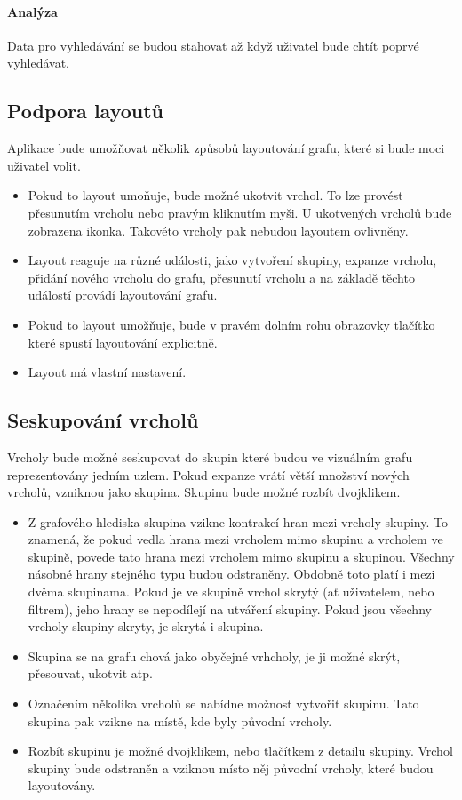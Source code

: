 \paragraph{Analýza} Data pro vyhledávání se budou stahovat až když uživatel bude chtít poprvé vyhledávat.

\subsection{Podpora layoutů}
Aplikace bude umožňovat několik způsobů layoutování grafu, které si bude moci uživatel volit.

\begin{itemize}
    \item Pokud to layout umoňuje, bude možné ukotvit vrchol. To lze provést přesunutím vrcholu nebo pravým kliknutím myši. U ukotvených vrcholů bude zobrazena ikonka. Takovéto vrcholy pak nebudou layoutem ovlivněny.
    \item Layout reaguje na různé události, jako vytvoření skupiny, expanze vrcholu, přidání nového vrcholu do grafu, přesunutí vrcholu a na základě těchto událostí provádí layoutování grafu.
    \item Pokud to layout umožňuje, bude v pravém dolním rohu obrazovky tlačítko které spustí layoutování explicitně.
    \item Layout má vlastní nastavení.
\end{itemize}

\subsection{Seskupování vrcholů}
Vrcholy bude možné seskupovat do skupin které budou ve vizuálním grafu reprezentovány jedním uzlem. Pokud expanze vrátí větší množství nových vrcholů, vzniknou jako skupina. Skupinu bude možné rozbít dvojklikem.

\begin{itemize}
    \item Z grafového hlediska skupina vzikne kontrakcí hran mezi vrcholy skupiny. To znamená, že pokud vedla hrana mezi vrcholem mimo skupinu a vrcholem ve skupině, povede tato hrana mezi vrcholem mimo skupinu a skupinou. Všechny násobné hrany stejného typu budou odstraněny. Obdobně toto platí i mezi dvěma skupinama. Pokud je ve skupině vrchol skrytý (ať uživatelem, nebo filtrem), jeho hrany se nepodílejí na utváření skupiny. Pokud jsou všechny vrcholy skupiny skryty, je skrytá i skupina.
    \item Skupina se na grafu chová jako obyčejné vrhcholy, je ji možné skrýt, přesouvat, ukotvit atp.
    \item Označením několika vrcholů se nabídne možnost vytvořit skupinu. Tato skupina pak vzikne na místě, kde byly původní vrcholy.
    \item Rozbít skupinu je možné dvojklikem, nebo tlačítkem z detailu skupiny. Vrchol skupiny bude odstraněn a vziknou místo něj původní vrcholy, které budou layoutovány.
\end{itemize}
